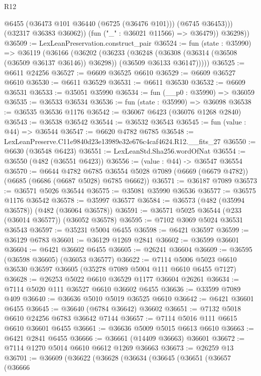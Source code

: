 \begin{lexlean}{R12}
\begin{coremodule}
                @6455
                (@36473 @101 @36440 (@6725 (@36476 @101)))
                (@6745 @36453)))
            (@32317 @36383 @36062))
          (fun ("_" : @36021 @11566) => @36479))
        @36298))
@36509 := LexLeanPreservation.construct_pair
@36524 := fun (state : @35990) =>
  @36119
    (@36166
      (@36202
        (@36233
          (@36248
            (@36308 (@36314 (@36508 (@36509 @36137 @36146)) @36298))
            (@36509 @36133 @36147)))))
@36525 := @6611 @24256
@36527 := @6609 @36525 @6610
@36529 := @6609 @36527 @6610
@36530 := @6611 @36529
@36531 := @6611 @36530
@36532 := @6609 @36531
@36533 := @35051 @35990
@36534 := fun (__p0 : @35990) => @36059
@36535 := @36533 @36534
@36536 := fun (state : @35990) => @36098
@36538 := @36535 @36536 @1176
@36542 := @36067 @6423 (@36076 @1268 @2840)
@36543 := @36538 @36542
@36544 := @36532 @36543
@36545 := fun (value : @44) => @36544
@36547 := @6620 @4782 @6785
@36548 := LexLeanPreserve.C11e9840d23e13989e32e676c4caf4624.R12.__fits_27
@36550 := @6630 (@36548 @6423)
@36551 := LexLeanStd.Sha256.wordOfNat
@36554 := @36550 (@482 (@36551 @6423))
@36556 := (value : @44) -> @36547 @36554
@36570 := @6644
    @4782
    @6785
    @36554
    @5028
    @7089
    (@6669 (@6679 @4782))
    (@6685 (@6686 (@6687 @5028) @6785 @6662))
@36571 := @36187 @7089
@36573 := @36571 @5026 @36544
@36575 := @35081 @35990 @36536
@36577 := @36575 @1176 @36542
@36578 := @35997 @36577
@36584 := @36573 (@482 (@35994 @36578)) (@482 (@36064 @36578))
@36591 := @36571 @5025 @36544 (@233 (@36014 @36577)) (@36052 @36578)
@36595 := @7102 @3069 @5024 @36531 @36543
@36597 := @35231 @5004 @6455
@36598 := @6421 @36597
@36599 := @36129 @6783
@36601 := @36129 @1269 @2841
@36602 := @36599 @36601
@36604 := @6421 @36602 @6455
@36605 := @26241 @36604
@36609 := @36595 (@36598 @36605) (@36053 @36577)
@36622 := @7114 @5006 @5023 @6610 @36530 @36597 @36605 (@35278 @7089 @5004 @111 @6610 @6455 @7127)
@36628 := @26253 @5022 @6610 @36529 @1177 @36604 @26261
@36634 := @7114 @5020 @111 @36527 @6610 @36602 @6455
@36636 := @33599 @7089 @409
@36640 := @36636 @5010 @5019 @36525 @6610
@36642 := @6421 @36601 @6455
@36645 := @36640 (@6784 @36642) @36602
@36651 := @7132 @5018 @6610 @24256 @6783 @36642 @7144
@36657 := @7114 @5016 @111 @6615 @6610 @36601 @6455
@36661 := @36636 @5009 @5015 @6613 @6610
@36663 := @6421 @2841 @6455
@36666 := @36661 (@14409 @36663) @36601
@36672 := @7114 @1270 @5014 @6610 @6612 @1269 @36663
@36673 := @26259 @13
@36701 := @36609
    (@36622
      (@36628
        (@36634
          (@36645
            (@36651
              (@36657
                (@36666

\end{coremodule}
\end{lexlean}
